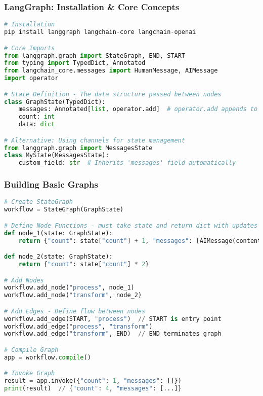 \begin{frame}[fragile]\frametitle{LangGraph: Installation \& Core Concepts}
      \begin{lstlisting}[language=python,basicstyle=\tiny]
# Installation
pip install langgraph langchain-core langchain-openai

# Core Imports
from langgraph.graph import StateGraph, END, START
from typing import TypedDict, Annotated
from langchain_core.messages import HumanMessage, AIMessage
import operator

# State Definition - The data structure passed between nodes
class GraphState(TypedDict):
    messages: Annotated[list, operator.add]  # operator.add appends to list
    count: int
    data: dict

# Alternative: Using channels for state management
from langgraph.graph import MessagesState
class MyState(MessagesState):
    custom_field: str  # Inherits 'messages' field automatically
  \end{lstlisting}
\end{frame}

\begin{frame}[fragile]\frametitle{Building Basic Graphs}
      \begin{lstlisting}[language=python,basicstyle=\tiny]
# Create StateGraph
workflow = StateGraph(GraphState)

# Define Node Functions - must take state and return dict with updates
def node_1(state: GraphState):
    return {"count": state["count"] + 1, "messages": [AIMessage(content="Step 1")]}

def node_2(state: GraphState):
    return {"count": state["count"] * 2}

# Add Nodes
workflow.add_node("process", node_1)
workflow.add_node("transform", node_2)

# Add Edges - Define flow between nodes
workflow.add_edge(START, "process")  // START is entry point
workflow.add_edge("process", "transform")
workflow.add_edge("transform", END)  // END terminates graph

# Compile Graph
app = workflow.compile()

# Invoke Graph
result = app.invoke({"count": 1, "messages": []})
print(result)  // {"count": 4, "messages": [...]}
  \end{lstlisting}
\end{frame}

